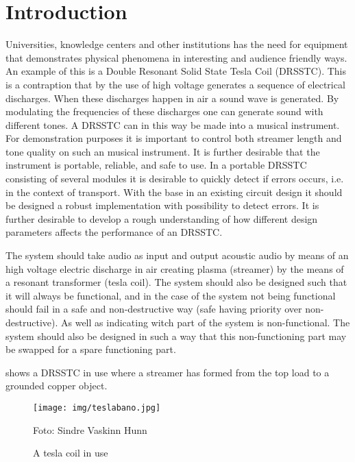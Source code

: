 \chapter{Introduction}
\label{intro}
Universities, knowledge centers and other institutions has the need for equipment that demonstrates physical phenomena in interesting and audience friendly ways. An example of this is a Double Resonant Solid State Tesla Coil (DRSSTC). This is a contraption that by the use of high voltage generates a sequence of electrical discharges. When these discharges happen in air a sound wave is generated. By modulating the frequencies of these discharges one can generate sound with different tones. A DRSSTC can in this way be made into a musical instrument.
For demonstration purposes it is important to control both streamer length and tone quality on such an musical instrument. It is further desirable that the instrument is portable, reliable, and safe to use.
In a portable DRSSTC consisting of several modules it is desirable to quickly detect if errors occurs, i.e. in the context of transport. With the base in an existing circuit design it should be designed a robust implementation with possibility to detect errors. It is further desirable to develop a rough understanding of how different design parameters affects the performance of an DRSSTC.

The system should take audio as input and output acoustic audio by means of an high voltage electric discharge in air creating plasma (streamer) by the means of a resonant transformer (tesla coil). The system should also be designed such that it will always be functional, and in the case of the system not being functional should fail in a safe and non-destructive way (safe having priority over non-destructive). As well as indicating witch part of the system is non-functional. The system should also be designed in such a way that this non-functioning part may be swapped for a spare functioning part.

 shows a DRSSTC in use where a streamer has formed from the top load to a grounded copper object.

\begin{figure}[ht]
    \centering
    \texttt{[image: img/teslabano.jpg]}
    \caption{A tesla coil in use}
    Foto: Sindre Vaskinn Hunn
    \label{fig:teslabano}
\end{figure}